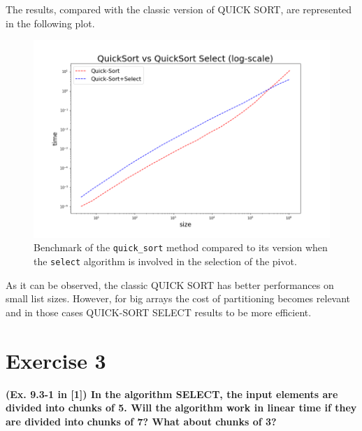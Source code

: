 \documentclass{article}
\begin{document}
	\newpage
	
	\noindent The results, compared with the classic version of QUICK SORT, are represented in the following plot.
	
	\begin{figure}[h]
		\centering
		\includegraphics[width=.8\textwidth]{../plot/quicksort.png}  
		\caption{Benchmark of the \texttt{quick\_sort} method compared to its version when the \texttt{select} algorithm is involved in the selection of the pivot.}
		\label{plot}
	\end{figure}
	
	\noindent As it can be observed, the classic QUICK SORT has better performances on small list sizes. However, for big arrays the cost of partitioning becomes relevant and in those cases QUICK-SORT SELECT results to be more efficient.
	
	
	\section*{Exercise 3}
	\textbf{(Ex. 9.3-1 in [1]) In the algorithm SELECT, the input elements are divided into chunks of 5. Will the algorithm work in linear time if they are divided into chunks of 7? What about chunks of 3?} \\
	
\end{document}
